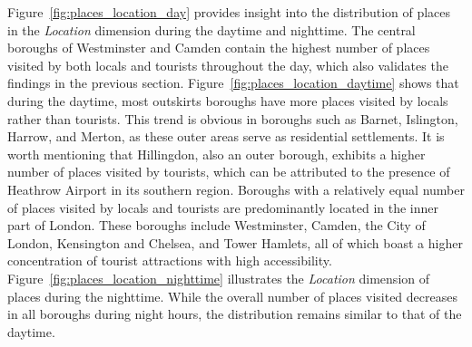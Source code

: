 \documentclass{article}
\theoremstyle{remark}
\begin{document}
Figure~\ref{fig:places_location_day} provides insight into the distribution of places in the \textit{Location} dimension during the daytime and nighttime. The central boroughs of Westminster and Camden contain the highest number of places visited by both locals and tourists throughout the day, which also validates the findings in the previous section. Figure~\ref{fig:places_location_daytime} shows that during the daytime, most outskirts boroughs have more places visited by locals rather than tourists. This trend is obvious in boroughs such as Barnet, Islington, Harrow, and Merton, as these outer areas serve as residential settlements. It is worth mentioning that Hillingdon, also an outer borough, exhibits a higher number of places visited by tourists, which can be attributed to the presence of Heathrow Airport in its southern region. Boroughs with a relatively equal number of places visited by locals and tourists are predominantly located in the inner part of London. These boroughs include Westminster, Camden, the City of London, Kensington and Chelsea, and Tower Hamlets, all of which boast a higher concentration of tourist attractions with high accessibility. Figure~\ref{fig:places_location_nighttime} illustrates the \textit{Location} dimension of places during the nighttime. While the overall number of places visited decreases in all boroughs during night hours, the distribution remains similar to that of the daytime.
\end{document}
